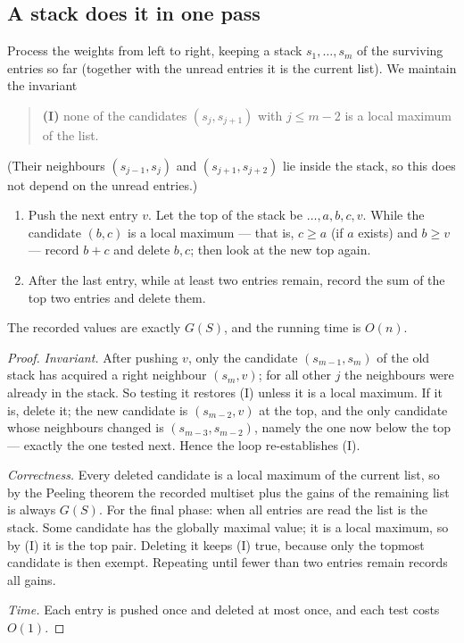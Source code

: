 \documentclass[11pt]{article}
\begin{document}
\subsection{A stack does it in one pass}\label{sec:stack}
Process the weights from left to right, keeping a stack $s_1,\dots,s_m$ of
the surviving entries so far (together with the unread entries it is the
current list). We maintain the invariant

\begin{quote}
\textbf{(I)} none of the candidates $(s_j,s_{j+1})$ with $j\le m-2$ is a
local maximum of the list.
\end{quote}
(Their neighbours $(s_{j-1},s_j)$ and $(s_{j+1},s_{j+2})$ lie inside the
stack, so this does not depend on the unread entries.)

\begin{theorembox}
\begin{enumerate}[leftmargin=1.8em,itemsep=1pt]
  \item Push the next entry $v$. Let the top of the stack be $\dots,a,b,c,v$.
        While the candidate $(b,c)$ is a local maximum --- that is,
        $c\ge a$ (if $a$ exists) and $b\ge v$ --- record $b+c$ and delete $b,c$;
        then look at the new top again.
  \item After the last entry, while at least two entries remain, record the
        sum of the top two entries and delete them.
\end{enumerate}
The recorded values are exactly $G(S)$, and the running time is $O(n)$.
\end{theorembox}
\begin{proof}
\emph{Invariant.} After pushing $v$, only the candidate $(s_{m-1},s_m)$ of
the old stack has acquired a right neighbour $(s_m,v)$; for all
other $j$ the neighbours were already in the stack. So testing it restores
(I) unless it is a local maximum. If it is, delete it; the new candidate is
$(s_{m-2},v)$ at the top, and the only candidate whose neighbours changed is
$(s_{m-3},s_{m-2})$, namely the one now below the top --- exactly the one tested next.
Hence the loop re-establishes (I).

\emph{Correctness.} Every deleted candidate is a local maximum of the
current list, so by the Peeling theorem the recorded multiset plus the gains of
the remaining list is always $G(S)$. For the final phase: when all entries
are read the list is the stack. Some candidate has the globally maximal
value; it is a local maximum, so by (I) it is the top pair. Deleting
it keeps (I) true, because only the topmost candidate is then
exempt. Repeating until fewer than two entries remain records all
gains.

\emph{Time.} Each entry is pushed once and deleted at most once, and each
test costs $O(1)$.
\end{proof}
\end{document}
